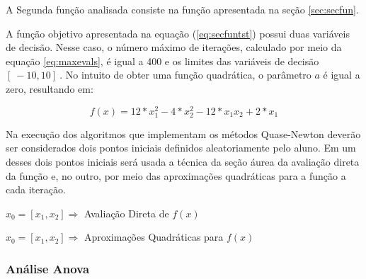 



A Segunda função analisada consiste na função apresentada na seção \ref{sec:secfun}.

A função objetivo apresentada na equação (\ref{eq:secfuntst}) possui duas variáveis de decisão. Nesse caso, o número máximo de iterações, calculado por meio da equação \ref{eq:maxevals}, é igual a 400 e os limites das variáveis de decisão $[\ -10 , 10 ]\ $. No intuito de obter uma função quadrática, o parâmetro $a$ é igual a zero, resultando em:

\begin{equation*} 
    f(x) = 12*x_1^2 - 4*x_2^2 - 12*x_1x_2 + 2*x_1
\end{equation*}

Na execução dos algoritmos que implementam os métodos Quase-Newton deverão ser considerados dois pontos iniciais definidos aleatoriamente pelo aluno. Em um desses dois pontos iniciais será usada a técnica da seção áurea da avaliação direta da função e, no outro, por meio das aproximações quadráticas para a função a cada iteração. 

\begin{minipage}{\linewidth}
    \centering
    $x_0=[x_1,x_2]\Longrightarrow$  Avaliação Direta de $f(x)$
    \label{tab:tble} 
    \writetable{\tble}
    \bigskip
\end{minipage}

\begin{minipage}{\linewidth}
    \centering
    $x_0=[x_1,x_2]\Longrightarrow$  Aproximações Quadráticas para $f(x)$
    \label{tab:tblf} 
    \writetable{\tblf}
    \bigskip
\end{minipage}  
   
\subsubsection{Análise Anova}

